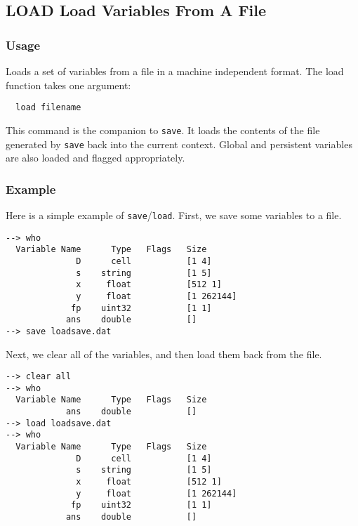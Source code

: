%
%
%
\subsection{LOAD Load Variables From A File}
\subsubsection{Usage}
Loads a set of variables from a file in a machine independent format.
The load function takes one argument:
\begin{verbatim}
  load filename
\end{verbatim}
This command is the companion to \verb|save|.  It loads the contents of the
file generated by \verb|save| back into the current context.  Global and 
persistent variables are also loaded and flagged appropriately.
\subsubsection{Example}
Here is a simple example of \verb|save|/\verb|load|.  First, we save some variables to a file.
\begin{verbatim}
--> who
  Variable Name      Type   Flags   Size
              D      cell           [1 4]
              s    string           [1 5]
              x     float           [512 1]
              y     float           [1 262144]
             fp    uint32           [1 1]
            ans    double           []
--> save loadsave.dat
\end{verbatim}
Next, we clear all of the variables, and then load them back from the file.
\begin{verbatim}
--> clear all
--> who
  Variable Name      Type   Flags   Size
            ans    double           []
--> load loadsave.dat
--> who
  Variable Name      Type   Flags   Size
              D      cell           [1 4]
              s    string           [1 5]
              x     float           [512 1]
              y     float           [1 262144]
             fp    uint32           [1 1]
            ans    double           []
\end{verbatim}


